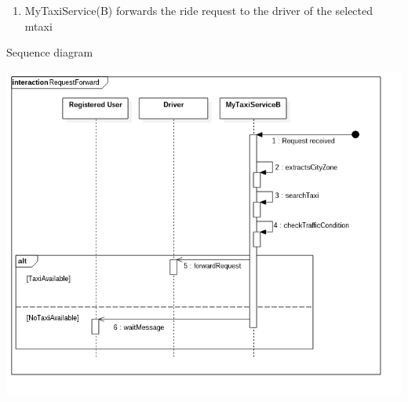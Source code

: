 \documentclass[11pt,titlepage]{article} %
\begin{document}
\begin{enumerate}
\begin{description}
\begin{enumerate}
			          \item MyTaxiService(B) forwards the ride request to the driver of the selected mtaxi
			\end{enumerate}
		\end{description}
		\newpage
		Sequence diagram
		\begin{center}
		\includegraphics[scale=0.52]{usecase3.png}
		\end{center}


\end{enumerate}
\end{document}
